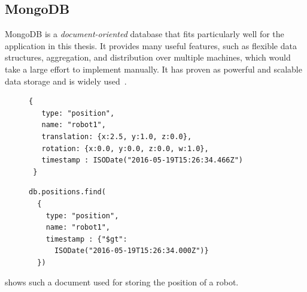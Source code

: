 \subsection{MongoDB}
\label{sec:mongodb}
MongoDB is a \emph{document-oriented} database that fits particularly
well for the application in this thesis. It provides many useful
features, such as flexible data structures, aggregation, and
distribution over multiple machines, which would take a large effort
to implement manually. It has proven as powerful and scalable data
storage and is widely used~\cite{mongodb,RoboDB}.
\begin{figure}
  \begin{minipage}{0.6\linewidth}
\begin{lstlisting}[style=SmallJSON,
  caption={MongoDB document representing\protect\\ the position of a robot},
  label=lst:mongo-document,
  framexleftmargin=2pt, xleftmargin=2pt,
 morekeywords={}, numbers=none]
 {
   type: "position",
   name: "robot1",
   translation: {x:2.5, y:1.0, z:0.0},
   rotation: {x:0.0, y:0.0, z:0.0, w:1.0},
   timestamp : ISODate("2016-05-19T15:26:34.466Z")
 }
\end{lstlisting}
  \end{minipage}
  \begin{minipage}{0.4\linewidth}
\begin{lstlisting}[style=SmallJSON,
  caption={MongoDB query yielding the document in \reflst{lst:mongo-document}},
  label=lst:mongo-query,
  framexleftmargin=2pt, xleftmargin=10pt,
 morekeywords={}, numbers=none]
db.positions.find(
  {
    type: "position",
    name: "robot1",
    timestamp : {"$gt":
      ISODate("2016-05-19T15:26:34.000Z")}
  })
\end{lstlisting}
  \end{minipage}
  \vspace{-0.8cm}
\end{figure}
 shows such a document
used for storing the position of a robot.

